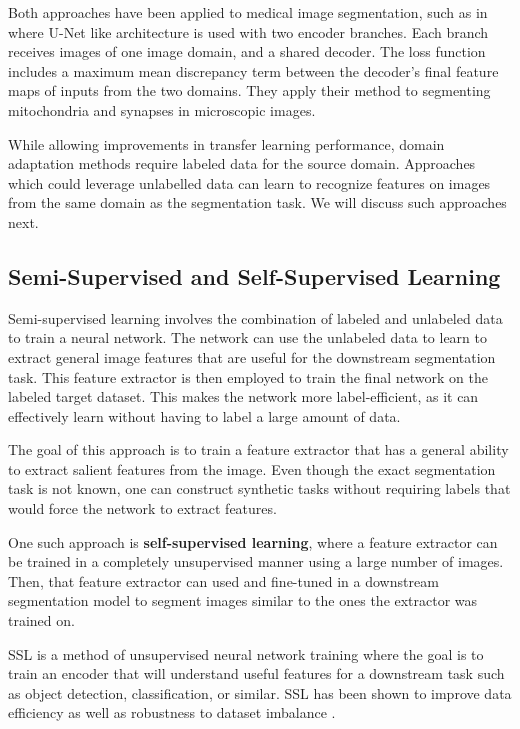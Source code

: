 Both approaches have been applied to medical image segmentation, such as in \citet{bermudez-chaconDomainadaptiveTwostreamUNet2018} where U-Net like architecture is used with two encoder branches. Each branch receives images of one image domain, and a shared decoder. The loss function includes a maximum mean discrepancy term between the decoder's final feature maps of inputs from the two domains. They apply their method to segmenting mitochondria and synapses in microscopic images. 

While allowing improvements in transfer learning performance, domain adaptation methods require labeled data for the source domain. Approaches which could leverage unlabelled data can learn to recognize features on images from the same domain as the segmentation task. We will discuss such approaches next.

	\subsection{Semi-Supervised and Self-Supervised Learning}
	
Semi-supervised learning involves the combination of labeled and unlabeled data to train a neural network. The network can use the unlabeled data to learn to extract general image features that are useful for the downstream segmentation task. This feature extractor is then employed to train the final network on the labeled target dataset. This makes the network more label-efficient, as it can effectively learn without having to label a large amount of data.

The goal of this approach is to train a feature extractor that has a general ability to extract salient features from the image. Even though the exact segmentation task is not known, one can construct synthetic tasks without requiring labels that would force the network to extract features.

One such approach is \textbf{self-supervised learning}, where a feature extractor can be trained in a completely unsupervised manner using a large number of images. Then, that feature extractor can used and fine-tuned in a downstream segmentation model to segment images similar to the ones the extractor was trained on.

SSL is a method of unsupervised neural network training where the
goal is to train an encoder that will understand useful features for a downstream
task such as object detection, classification, or similar. SSL has
been shown to improve data efficiency
\cite{chenSimpleFrameworkContrastive2020} as well as robustness to dataset imbalance
\cite{liuSelfsupervisedLearningMore2021}.

